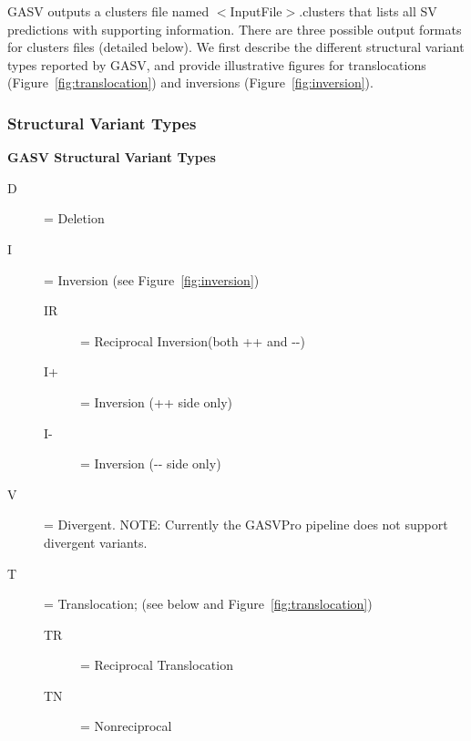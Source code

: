 \documentclass[11pt]{article}
\begin{document}
GASV outputs a clusters file named $<$InputFile$>$.clusters that lists all SV predictions with supporting information. There are three possible output formats for clusters files (detailed below).  We first describe the different structural variant types reported by GASV, and provide illustrative figures for translocations (Figure~\ref{fig:translocation}) and inversions (Figure~\ref{fig:inversion}).

\subsubsection{Structural Variant Types}
\label{sec:SVTypes}

\begin{framed}
\begin{center} \textbf{GASV Structural Variant Types} \end{center}
\begin{description}
\item[D] =     Deletion
\item[I] =    Inversion  (see Figure~\ref{fig:inversion})
\begin{description}
\item[IR] = Reciprocal Inversion(both ++ and -{}-)
\item[I+] =    Inversion (++ side only)
\item[I-] =    Inversion (-{}- side only)
\end{description}
\item[V] =    Divergent. {\scriptsize NOTE: Currently the GASVPro pipeline does not support divergent variants.}
\item[T] = Translocation; (see below and Figure~\ref{fig:translocation})
\begin{description}
\item[TR] = Reciprocal Translocation
\item[TN] = Nonreciprocal 
\end{description}
\end{description}
\end{framed}
\label{structvartypes}
\end{document}
